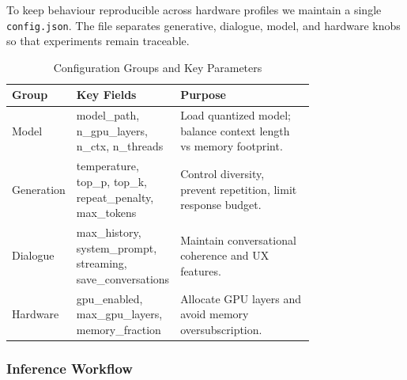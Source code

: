 \documentclass[12pt,a4paper]{article}
\begin{document}
To keep behaviour reproducible across hardware profiles we maintain a single \texttt{config.json}. The file separates generative, dialogue, model, and hardware knobs so that experiments remain traceable.

\begin{table}[H]
\centering
\caption{Configuration Groups and Key Parameters}
\label{tab:config_params}
\begin{tabular}{|l|p{0.26\linewidth}|p{0.5\linewidth}|}
\hline
	\textbf{Group} & \textbf{Key Fields} & \textbf{Purpose} \\
\hline
Model & model\_path, n\_gpu\_layers, n\_ctx, n\_threads & Load quantized model; balance context length vs memory footprint. \\
Generation & temperature, top\_p, top\_k, repeat\_penalty, max\_tokens & Control diversity, prevent repetition, limit response budget. \\
Dialogue & max\_history, system\_prompt, streaming, save\_conversations & Maintain conversational coherence and UX features. \\
Hardware & gpu\_enabled, max\_gpu\_layers, memory\_fraction & Allocate GPU layers and avoid memory oversubscription. \\
\hline
\end{tabular}
\end{table}

\subsubsection*{Inference Workflow}
\end{document}
